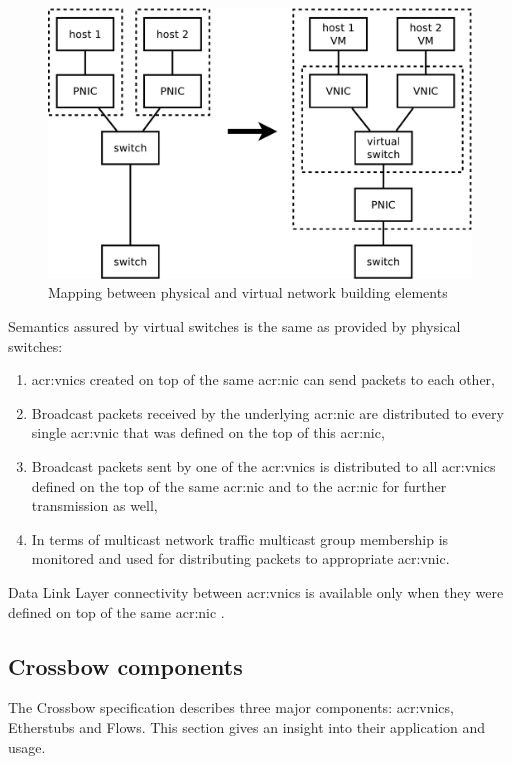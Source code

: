 \documentclass[11pt,openany]{book}
\begin{document}
        \begin{figure}[H]
          \centering
          \includegraphics[width=.7\textwidth]{img/solaris/mapping.pdf}

          \caption{Mapping between physical and virtual network building elements}
        \end{figure}
        
        Semantics assured by virtual switches is the same as provided by physical switches: 

        \begin{enumerate}
          \item \gls{acr:vnic}s created on top of the same \gls{acr:nic} can send packets to each other,
          \item Broadcast packets received by the underlying \gls{acr:nic} are distributed to every single
                \gls{acr:vnic} that was defined on the top of this \gls{acr:nic},
          \item Broadcast packets sent by one of the \gls{acr:vnic}s is distributed to all \gls{acr:vnic}s defined on
                the top of the same \gls{acr:nic} and to the \gls{acr:nic} for further transmission as well,
          \item In terms of multicast network traffic multicast group membership is monitored and used for distributing
                packets to appropriate \gls{acr:vnic}.
        \end{enumerate}

        Data Link Layer connectivity between \gls{acr:vnic}s is available only when they were defined on top of the same
        \gls{acr:nic} \cite{crossbow2}. 

	
      \subsection{Crossbow components}

        The Crossbow specification describes three major components: \gls{acr:vnic}s, Etherstubs and Flows. This section
        gives an insight into their application and usage.
\end{document}
